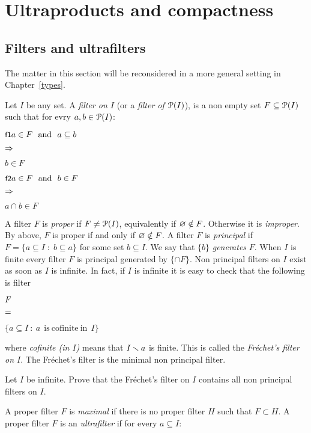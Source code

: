 \documentclass[creche.tex]{subfiles}
\begin{document}
\chapter{Ultraproducts and compactness}
\label{ultraprodotti}

\def\medrel#1{\parbox[t]{6ex}{$\displaystyle\hfil #1$}}
\def\ceq#1#2#3{\parbox{25ex}{$\displaystyle #1$}\medrel{#2}$\displaystyle  #3$}




\section{Filters and ultrafilters}\label{ultrafiltri}

The matter in this section will be reconsidered in a more general setting in Chapter~\ref{types}.

Let $I$ be any set. A \emph{filter on $I$\/} (or a \emph{filter of $\P(I)$}), is a non empty set $F\subseteq \P(I)$ such that for evry $a, b\in \P(I)$:

\ceq{\ssf{f1}\hfill a\in F\ \ \textrm{and}\ \ a\subseteq b}{\IMP}{b\in F}

\ceq{\ssf{f2}\hfill a\in F\ \ \textrm{and}\ \ b\in F}{\IMP}{a\cap b\in F}

A filter $F$ is \emph{proper\/} if $F\neq\P(I)$, equivalently if $\0\notin F$. Otherwise it is \emph{improper}. By  above, $F$ is proper if and only if $\0\notin F$. A filter $F$ is \emph{principal\/} if $F=\{a\subseteq I\; :\; b\subseteq a\}$ for some set $b\subseteq I$. We say that $\{b\}$ \emph{generates\/} $F$. When $I$ is finite every filter $F$ is principal generated by $\{\cap F\}$. Non principal filters on $I$ exist as soon as $I$ is infinite. In fact, if $I$ is infinite it is easy to check that the following is filter

\ceq{\hfill F}{=}{\Big\{a\subseteq I\ :\ a \ \mathrm{\ is\ cofinite\ in\ }\ I\Big\}}

where \emph{cofinite (in $I$)} means that $I\sm a$ is finite. This is called the \emph{Fr\'echet's filter on $I$}. The Fr\'echet's filter is the minimal non principal filter.

\begin{exercise}
Let $I$ be infinite. Prove that the  Fr\'echet's filter on $I$ contains all non principal filters on $I$.\QED
\end{exercise}

A proper filter $F$ is \emph{maximal\/} if there is no proper filter $H$ such that $F\subset H$. A proper filter $F$ is an \emph{ultrafilter\/} if for every $a\subseteq I$:
\end{document}
